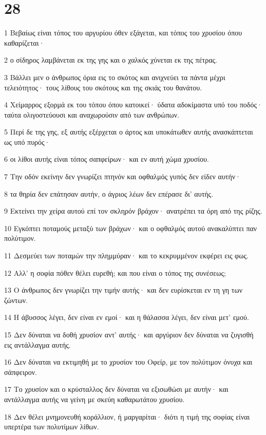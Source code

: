 \chapter{28}

\par 1 Βεβαίως είναι τόπος του αργυρίου όθεν εξάγεται, και τόπος του χρυσίου όπου καθαρίζεται·
\par 2 ο σίδηρος λαμβάνεται εκ της γης και ο χαλκός χύνεται εκ της πέτρας.
\par 3 Βάλλει μεν ο άνθρωπος όρια εις το σκότος και ανιχνεύει τα πάντα μέχρι τελειότητος· τους λίθους του σκότους και της σκιάς του θανάτου.
\par 4 Χείμαρρος εξορμά εκ του τόπου όπου κατοικεί· ύδατα αδοκίμαστα υπό του ποδός· ταύτα ολιγοστεύουσι και αναχωρούσιν από των ανθρώπων.
\par 5 Περί δε της γης, εξ αυτής εξέρχεται ο άρτος και υποκάτωθεν αυτής ανασκάπτεται ως υπό πυρός·
\par 6 οι λίθοι αυτής είναι τόπος σαπφείρων· και εν αυτή χώμα χρυσίου.
\par 7 Την οδόν εκείνην δεν γνωρίζει πτηνόν και οφθαλμός γυπός δεν είδεν αυτήν·
\par 8 τα θηρία δεν επάτησαν αυτήν, ο άγριος λέων δεν επέρασε δι' αυτής.
\par 9 Εκτείνει την χείρα αυτού επί τον σκληρόν βράχον· ανατρέπει τα όρη από της ρίζης.
\par 10 Εγκόπτει ποταμούς μεταξύ των βράχων· και ο οφθαλμός αυτού ανακαλύπτει παν πολύτιμον.
\par 11 Δεσμεύει των ποταμών την πλημμύραν· και το κεκρυμμένον εκφέρει εις φως.
\par 12 Αλλ' η σοφία πόθεν θέλει ευρεθή; και που είναι ο τόπος της συνέσεως;
\par 13 Ο άνθρωπος δεν γνωρίζει την τιμήν αυτής· και δεν ευρίσκεται εν τη γη των ζώντων.
\par 14 Η άβυσσος λέγει, δεν είναι εν εμοί· και η θάλασσα λέγει, δεν είναι μετ' εμού.
\par 15 Δεν δύναται να δοθή χρυσίον αντ' αυτής· και αργύριον δεν δύναται να ζυγισθή εις αντάλλαγμα αυτής.
\par 16 Δεν δύναται να εκτιμηθή με το χρυσίον του Οφείρ, με τον πολύτιμον όνυχα και σάπφειρον.
\par 17 Το χρυσίον και ο κρύσταλλος δεν δύναται να εξισωθώσι με αυτήν· και αντάλλαγμα αυτής να γείνη με σκεύη καθαρωτάτου χρυσίου.
\par 18 Δεν θέλει μνημονευθή κοράλλιον, ή μαργαρίται· διότι η τιμή της σοφίας είναι υπερτέρα των πολυτίμων λίθων.
